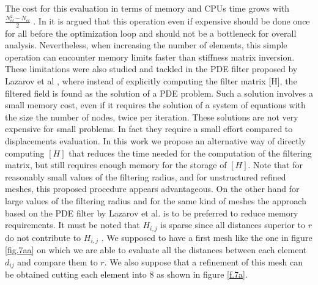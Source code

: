   The cost for this evaluation in terms of memory and CPUs time grows with $\frac{N_{el}^2-N_{el}}{2}$ . In \cite{talischi2012polytop} it is argued that this operation even if  expensive should be done once for all before the optimization loop and should not be a bottleneck for overall analysis. Nevertheless, when increasing the number of elements, this simple operation can encounter memory limits faster than stiffness matrix inversion. These limitations were also studied and tackled in the PDE filter proposed by Lazarov et al \cite{lazarov2011filters}, where instead of explicitly computing the filter matrix [H], the filtered field is found as the solution of a PDE problem. Such a solution involves a small memory cost, even if it requires the solution of a system of equations with the size the number of nodes, twice per iteration. These solutions are not very expensive for small problems. In fact they require a small effort compared to displacements evaluation. In this work we propose an alternative way of directly computing $\left[ H \right]$ that reduces the time needed for the computation of the filtering matrix, but still requires enough memory for the storage of $\left[ H \right]$. Note that for reasonably small values of the filtering radius, and for unstructured refined meshes, this proposed procedure appears advantageous. On the other hand for large values of the filtering radius and for the same kind of meshes the approach based on the PDE filter by Lazarov et al. \cite{lazarov2011filters} is to be preferred to reduce memory requirements. 
  It must be noted that $H_{i,j}$ is sparse since all distances superior to $r$ do not contribute to $H_{i,j}$ . We supposed to have a first mesh like the one in figure \ref{fig.7aa} on which we are able to evaluate all the distances between each element $d_{ij}$ and compare them to $r$. We also suppose that a refinement of this mesh can be obtained cutting each element into 8 as shown in figure \ref{f.7a}.
